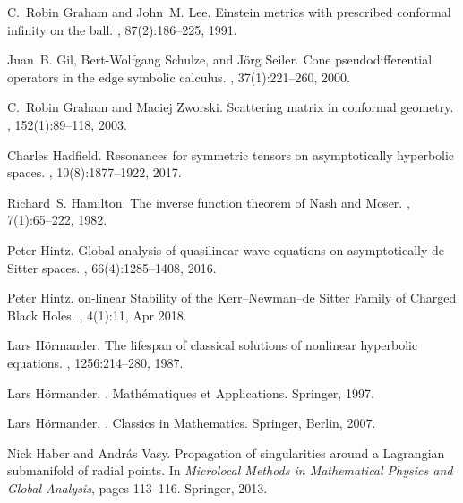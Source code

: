 \documentclass[reqno,11pt,letterpaper]{amsart}
\numberwithin{equation}{section}
\numberwithin{figure}{section}
\theoremstyle{definition}
\theoremstyle{remark}
\begin{document}
\begin{thebibliography}{GCHMG05}
C.~Robin Graham and John~M. Lee.
\newblock Einstein metrics with prescribed conformal infinity on the ball.
, 87(2):186--225, 1991.

Juan~B. Gil, Bert-Wolfgang Schulze, and J{\"o}rg Seiler.
\newblock Cone pseudodifferential operators in the edge symbolic calculus.
, 37(1):221--260, 2000.

C.~Robin Graham and Maciej Zworski.
\newblock Scattering matrix in conformal geometry.
, 152(1):89--118, 2003.

Charles Hadfield.
\newblock Resonances for symmetric tensors on asymptotically hyperbolic spaces.
, 10(8):1877--1922, 2017.

Richard~S. Hamilton.
\newblock The inverse function theorem of {N}ash and {M}oser.
, 7(1):65--222, 1982.

Peter Hintz.
\newblock Global analysis of quasilinear wave equations on asymptotically de
  {S}itter spaces.
, 66(4):1285--1408, 2016.

Peter Hintz.
on-linear {S}tability of the {K}err--{N}ewman--de {S}itter
  {F}amily of {C}harged {B}lack {H}oles.
, 4(1):11, Apr 2018.

Lars H{\"o}rmander.
\newblock The lifespan of classical solutions of nonlinear hyperbolic
  equations.
, 1256:214--280, 1987.

Lars H{\"o}rmander.
.
\newblock Math{\'e}matiques et Applications. Springer, 1997.

Lars H{\"o}rmander.
.
\newblock Classics in Mathematics. Springer, Berlin, 2007.

Nick Haber and Andr{\'a}s Vasy.
\newblock Propagation of singularities around a {L}agrangian submanifold of
  radial points.
\newblock In {\em Microlocal Methods in Mathematical Physics and Global
  Analysis}, pages 113--116. Springer, 2013.


\end{thebibliography}
\end{document}

